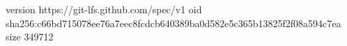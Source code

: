 version https://git-lfs.github.com/spec/v1
oid sha256:c66bd715078ee76a7eec8fcdcb640389ba0d582e5c365b13825f2f08a594c7ea
size 349712
